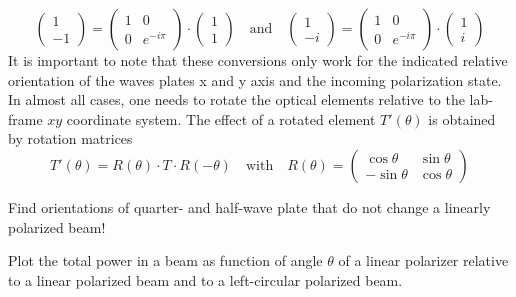 \begin{equation}
            \begin{pmatrix}
                1 \\ -1
             \end{pmatrix}
             = 
            \begin{pmatrix}
                1 & 0 \\ 0 & e^{-i \pi}
                 \end{pmatrix} \cdot
                 \begin{pmatrix}
                    1 \\ 1
                 \end{pmatrix}
                 \quad \text{and} \quad
                 \begin{pmatrix}
                    1 \\ -i
                 \end{pmatrix}
                 = 
                \begin{pmatrix}
                    1 & 0 \\ 0 & e^{-i \pi}
                     \end{pmatrix} \cdot
                     \begin{pmatrix}
                        1 \\ i
                     \end{pmatrix}
\end{equation}
It is important to note that these conversions only work for the indicated relative orientation of the waves plates x and y axis and the incoming polarization state. In almost all cases, one needs to rotate the  optical elements relative to the lab-frame $xy$ coordinate system. The effect of a rotated element $T'(\theta)$ is obtained by rotation matrices
\begin{equation}
    T'(\theta) = R(\theta) \cdot T \cdot R(-\theta) \quad \text{with} \quad
    R(\theta) = 
    \begin{pmatrix}
        \cos \theta & \sin \theta \\ 
        - \sin \theta & \cos \theta 
    \end{pmatrix}
\end{equation}

\begin{questions}
    \item Find orientations of quarter- and half-wave plate that do not change a linearly polarized beam!
    \item Plot the total power in a beam as function of angle $\theta$ of a linear polarizer relative to a linear polarized beam and to a left-circular polarized beam.
\end{questions}


